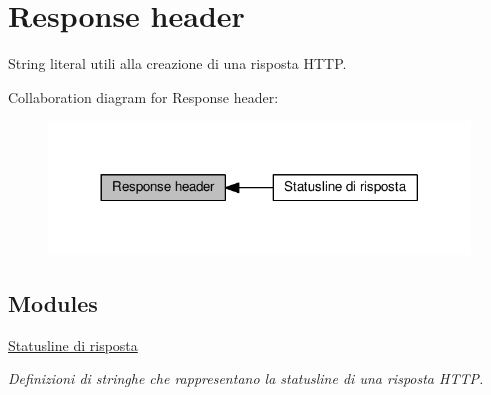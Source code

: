 \hypertarget{group__RHDR}{}\section{Response header}
\label{group__RHDR}


String literal utili alla creazione di una risposta H\+T\+T\+P.  


Collaboration diagram for Response header\+:\nopagebreak
\begin{figure}[H]
\begin{center}
\leavevmode
\includegraphics[width=317pt]{group__RHDR}
\end{center}
\end{figure}
\subsection*{Modules}
\begin{DoxyCompactItemize}
\item 
\hyperlink{group__RHDR__STATUSLINE}{Statusline di risposta}
\begin{DoxyCompactList}\small\item\em Definizioni di stringhe che rappresentano la statusline di una risposta H\+T\+T\+P. \end{DoxyCompactList}\end{DoxyCompactItemize}
